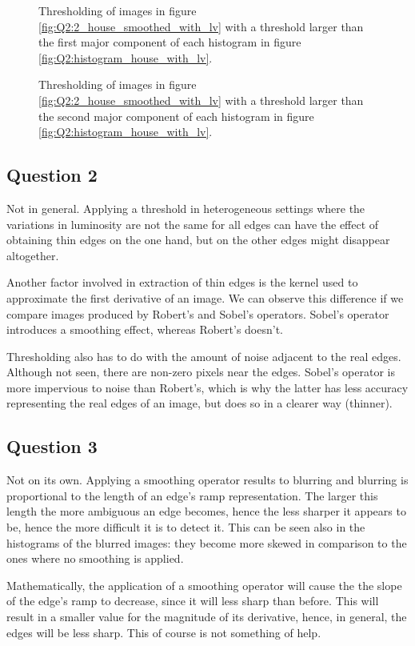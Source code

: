 \begin{figure}[H]
	\centering
	\scalebox{0.9}{}
	\caption{Thresholding of images in figure \ref{fig:Q2:2_house_smoothed_with_lv} with a threshold larger than the first major component of 
	each histogram in figure \ref{fig:Q2:histogram_house_with_lv}.}
	\label{fig:Q2:threshold_house_1_with_lv}
\end{figure}

\begin{figure}[H]
	\centering
	\scalebox{0.9}{}
	\caption{Thresholding of images in figure \ref{fig:Q2:2_house_smoothed_with_lv} with a threshold larger than the second major component of 
	each histogram in figure \ref{fig:Q2:histogram_house_with_lv}.}
	\label{fig:Q2:threshold_house_2_with_lv}
\end{figure}



\subsection{Question 2}

Not in general. Applying a threshold in heterogeneous settings where the variations in luminosity are not the same for all edges can have the effect of 
obtaining thin edges on the one hand, but on the other edges might disappear altogether.

Another factor involved in extraction of thin edges is the kernel used to approximate the first derivative of an image. 
We can observe this difference if we compare images produced by Robert's and Sobel's operators. Sobel's operator introduces a smoothing effect, whereas Robert's doesn't.

Thresholding also has to do with the amount of noise adjacent to the real edges. Although not seen, there are non-zero pixels near the edges.
Sobel's operator is more impervious to noise than Robert's, which is why the latter has less accuracy representing the real edges of an image, but
does so in a clearer way (thinner).


\subsection{Question 3}

Not on its own. Applying a smoothing operator results to blurring and blurring is proportional to the length of an edge's ramp representation. The larger this length
the more ambiguous an edge becomes, hence the less sharper it appears to be, hence the more difficult it is to detect it. This can be seen also in the histograms 
of the blurred images: they become more skewed in comparison to the ones where no smoothing is applied. 

Mathematically, the application of a smoothing operator will cause the the slope of the edge's ramp to decrease, since it will less sharp than before.
This will result in a smaller value for the magnitude of its derivative, hence, in general, the edges will be less sharp. This of course is not something
of help.